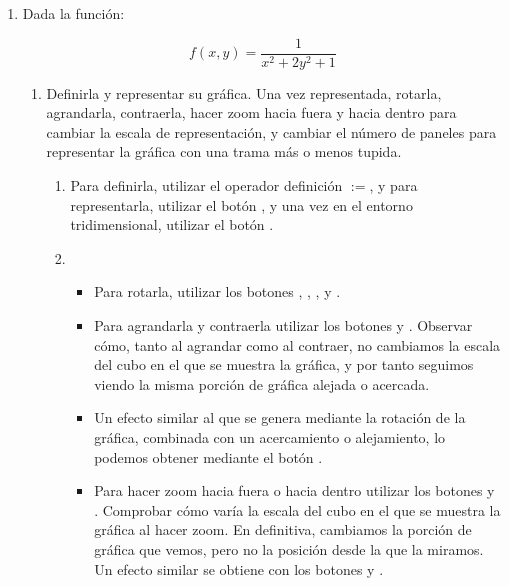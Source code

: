 \begin{enumerate}[leftmargin=*]
\item Dada la función:

\[
f(x,y) = \frac{1} {{x^2  + 2y^2  + 1}}
\]

\begin{enumerate}
  \item Definirla y representar su gráfica. Una vez representada,
  rotarla, agrandarla, contraerla, hacer zoom hacia fuera y hacia
  dentro para cambiar la escala de representación, y cambiar el
  número de paneles para representar la gráfica con una trama más
  o menos tupida.

\begin{indicacion}
{

\begin{enumerate}

\item Para definirla, utilizar el operador definición $:=$, y para
representarla, utilizar el botón , y una vez en el
entorno tridimensional, utilizar el botón .

\item

\begin{itemize}

\item Para rotarla, utilizar los botones ,
, ,
 y .

\item Para agrandarla y contraerla utilizar los botones
 y . Observar cómo, tanto al
agrandar como al contraer, no cambiamos la escala del cubo en el que
se muestra la gráfica, y por tanto seguimos viendo la misma porción
de gráfica alejada o acercada.

\item Un efecto similar al que se genera mediante la rotación de
la gráfica, combinada con un acercamiento o alejamiento, lo podemos
obtener mediante el botón .

\item Para hacer zoom hacia fuera o hacia dentro utilizar los
botones  y .
Comprobar cómo varía la escala del cubo en el que se muestra la
gráfica al hacer zoom. En definitiva, cambiamos la porción de
gráfica que vemos, pero no la posición desde la que la miramos. Un
efecto similar se obtiene con los botones  y .


\end{itemize}
\end{enumerate}}
\end{indicacion}
\end{enumerate}
\end{enumerate}
